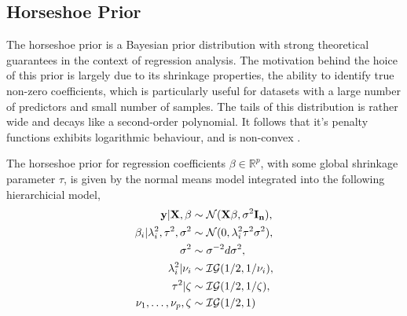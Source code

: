 \documentclass[
	a4paper, %
	10pt, %
	unnumberedsections, %
	twoside, %
]{LTJournalArticle}
\newcommand{\R}{\mathbb R}
\newcommand{\1}{\mathbbm{1}}
\begin{document}

\subsection{Horseshoe Prior}

The horseshoe prior is a Bayesian prior distribution with strong theoretical guarantees in the context of regression analysis. The motivation behind the hoice of this prior is largely due to its shrinkage properties, the ability to identify true non-zero coefficients, which is particularly useful for datasets with a large number of predictors and small number of samples. The tails of this distribution is rather wide and decays like a second-order polynomial. It follows that it's penalty functions exhibits logarithmic behaviour, and is non-convex \cite{Bhadra2017, Banerjee2022}.

The horseshoe prior for regression coefficients $\beta \in \R^p$, with some global shrinkage parameter $\tau$, is given by the normal means model integrated into the following hierarchicial model,
\begin{align*}
    {\bf y}  |  {\bf X}, \beta  &\sim \mathcal{N}( {\bf X} \beta , \sigma^2  {\bf I_n}), \\
    \beta_i | \lambda_i^2, \tau^2, \sigma^2 &\sim \mathcal{N}(0, \lambda_i^2 \tau^2 \sigma^2),\\
    \sigma^2 &\sim \sigma^{-2} d \sigma^2, \\
    \lambda_i^2| \nu_i &\sim  \mathcal{IG}(1/2, 1/\nu_i), \\
    \tau^2 | \zeta &\sim \mathcal{IG}(1/2, 1/\zeta), \\
    \nu_1, \ldots, \nu_p, \zeta &\sim \mathcal{IG}(1/2, 1)
\end{align*}
\end{document}
